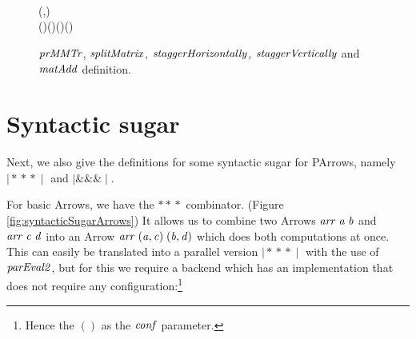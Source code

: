 \documentclass[paper=A4,twoside=true,openright,parskip=full,chapterprefix=true,headings=normal,bibliography=totoc,listof=totoc,titlepage=on,captions=tableabove,draft=false,british]{scrreprt}%
\begin{document}
\begin{figure}[t]
\begin{hscode}
\\[\blanklineskip]%
\>[B]{}\mathbin{::}\<[E]%
\\
\>[B]{}\;\;\mathrel{=}\plus {}\;\<[E]%
\\
\>[B]{}\<[5]%
\>[5]{}(,)\mathrel{=}\;\;\<[E]%
\\[\blanklineskip]%
\>[B]{}\mathrel{=}\;(\;)\mathbin{\$}\;(\mathbin{+})\;(\;)\;(\;){}\<[E]%
\ColumnHook
\end{hscode}\resethooks
\caption{\ensuremath{\Varid{prMMTr}}, \ensuremath{\Varid{splitMatrix}}, \ensuremath{\Varid{staggerHorizontally}}, \ensuremath{\Varid{staggerVertically}} and \ensuremath{\Varid{matAdd}} definition.}\label{fig:torus_example_rest}\end{figure}

\hypertarget{syntactic-sugar}{%
\section{Syntactic sugar}\label{syntactic-sugar}}

\label{syntacticSugar}

Next, we also give the definitions for some syntactic sugar for PArrows,
namely \ensuremath{\mathbin{\mid\!\!*\!*\!*\!\!\mid}} and \ensuremath{\mathbin{\mid\!\!\&\!\&\!\&\!\!\mid}}.

For basic Arrows, we have the \ensuremath{\mathbin{*\!*\!*}} combinator. (Figure
\ref{fig:syntacticSugarArrows}) It allows us to combine two Arrows
\ensuremath{\Varid{arr}\;\Varid{a}\;\Varid{b}} and \ensuremath{\Varid{arr}\;\Varid{c}\;\Varid{d}} into an Arrow \ensuremath{\Varid{arr}\;(\Varid{a},\Varid{c})\;(\Varid{b},\Varid{d})} which does
both computations at once. This can easily be translated into a parallel
version \ensuremath{\mathbin{\mid\!\!*\!*\!*\!\!\mid}} with the use of \ensuremath{\Varid{parEval2}}, but for this we require a
backend which has an implementation that does not require any
configuration:\footnote{Hence the \ensuremath{()} as the \ensuremath{\Varid{conf}} parameter.}
\end{document}
